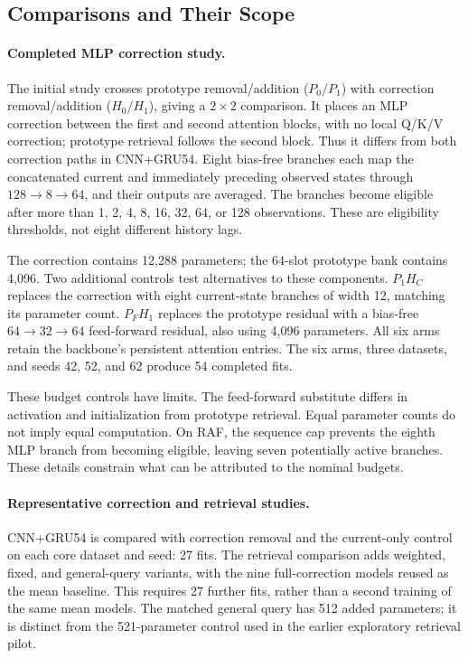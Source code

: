 \documentclass[runningheads]{llncs}
\begin{document}
\subsection{Comparisons and Their Scope}
\paragraph{Completed MLP correction study.}
The initial study crosses prototype removal/addition ($P_0/P_1$) with correction removal/addition ($H_0/H_1$), giving a $2\times2$ comparison. It places an MLP correction between the first and second attention blocks, with no local Q/K/V correction; prototype retrieval follows the second block. Thus it differs from both correction paths in CNN+GRU54. Eight bias-free branches each map the concatenated current and immediately preceding observed states through $128\!\to\!8\!\to\!64$, and their outputs are averaged. The branches become eligible after more than 1, 2, 4, 8, 16, 32, 64, or 128 observations. These are eligibility thresholds, not eight different history lags.

The correction contains 12,288 parameters; the 64-slot prototype bank contains 4,096. Two additional controls test alternatives to these components. $P_1H_C$ replaces the correction with eight current-state branches of width 12, matching its parameter count. $P_FH_1$ replaces the prototype residual with a bias-free $64\!\to\!32\!\to\!64$ feed-forward residual, also using 4,096 parameters. All six arms retain the backbone's persistent attention entries. The six arms, three datasets, and seeds 42, 52, and 62 produce 54 completed fits.

These budget controls have limits. The feed-forward substitute differs in activation and initialization from prototype retrieval. Equal parameter counts do not imply equal computation. On RAF, the sequence cap prevents the eighth MLP branch from becoming eligible, leaving seven potentially active branches. These details constrain what can be attributed to the nominal budgets.

\paragraph{Representative correction and retrieval studies.}
CNN+GRU54 is compared with correction removal and the current-only control on each core dataset and seed: 27 fits. The retrieval comparison adds weighted, fixed, and general-query variants, with the nine full-correction models reused as the mean baseline. This requires 27 further fits, rather than a second training of the same mean models. The matched general query has 512 added parameters; it is distinct from the 521-parameter control used in the earlier exploratory retrieval pilot.
\end{document}
